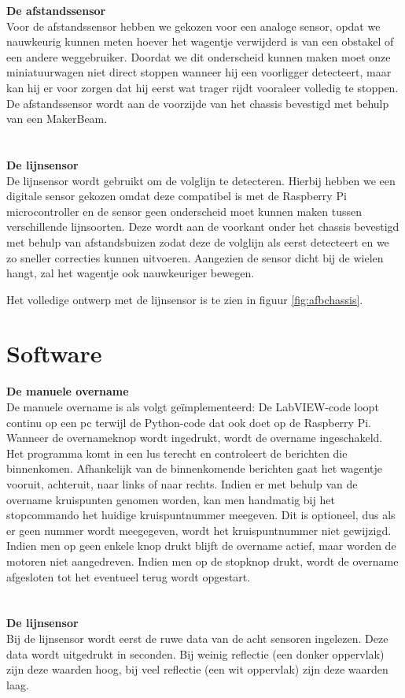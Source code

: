 \documentclass[a4paper,kulak]{kulakarticle}
\begin{document}
\noindent\textbf{\large De afstandssensor} \
\\
Voor de afstandssensor hebben we gekozen voor een analoge sensor, opdat we nauwkeurig kunnen meten hoever het wagentje verwijderd is van een obstakel of een andere weggebruiker. Doordat we dit onderscheid kunnen maken moet onze miniatuurwagen niet direct stoppen wanneer hij een voorligger detecteert, maar kan hij er voor  zorgen dat hij eerst wat trager rijdt vooraleer volledig te stoppen. De afstandssensor wordt aan de voorzijde van het chassis bevestigd met behulp van een MakerBeam.\\ \\
\\
\textbf{\large De lijnsensor} \
\\
De lijnsensor wordt gebruikt om de volglijn te detecteren. Hierbij hebben we een digitale sensor gekozen omdat deze compatibel is met de Raspberry Pi microcontroller en de sensor geen onderscheid moet kunnen maken tussen verschillende lijnsoorten. Deze wordt aan de voorkant onder het chassis bevestigd met behulp van afstandsbuizen zodat deze de volglijn als eerst detecteert en we zo sneller correcties kunnen uitvoeren. Aangezien de sensor dicht bij de wielen hangt, zal het wagentje ook nauwkeuriger bewegen.

Het volledige ontwerp met de lijnsensor is te zien in figuur \ref{fig:afbchassis}.

\section{Software}

\textbf{\large De manuele overname} \\
De manuele overname is als volgt geïmplementeerd: De LabVIEW-code loopt continu op een pc terwijl de Python-code dat ook doet op de Raspberry Pi. Wanneer de overnameknop wordt ingedrukt, wordt de overname ingeschakeld. Het programma komt in een lus terecht en controleert de berichten die binnenkomen. Afhankelijk van de binnenkomende berichten gaat het wagentje vooruit, achteruit, naar links of naar rechts. Indien er met behulp van de overname kruispunten genomen worden, kan men handmatig bij het stopcommando het huidige kruispuntnummer meegeven. Dit is optioneel, dus als er geen nummer wordt meegegeven, wordt het kruispuntnummer niet gewijzigd. Indien men op geen enkele knop drukt blijft de overname actief, maar worden de motoren niet aangedreven. Indien men op de stopknop drukt, wordt de overname afgesloten tot het eventueel terug wordt opgestart. \\ \\
\\
\textbf{\large De lijnsensor}\
\\
Bij de lijnsensor wordt eerst de ruwe data van de acht sensoren ingelezen. Deze data wordt uitgedrukt in seconden. Bij weinig reflectie (een donker oppervlak) zijn deze waarden hoog, bij veel reflectie (een wit oppervlak) zijn deze waarden laag. 
\end{document}
